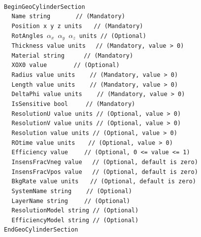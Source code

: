 ~\\
\noindent
{\tt BeginGeoCylinderSection} \\
$~~~~~${\tt Name             string                   $~~~~~~~~~~~~$   // (Mandatory)} \\
$~~~~~${\tt Position         x  y  z units                     $~~~$   // (Mandatory)} \\
$~~~~~${\tt RotAngles        $\alpha_x$  $\alpha_y$  $\alpha_z$ units  // (Optional)}  \\
$~~~~~${\tt Thickness        value  units                       $~~$   // (Mandatory, value > 0)} \\
$~~~~~${\tt Material         string                       $~~~~~~~~$   // (Mandatory)} \\
$~~~~~${\tt XOX0             value                   $~~~~~~~~~~~~~$   // (Optional)}  \\
$~~~~~${\tt Radius           value units                     $~~~~~$   // (Mandatory, value > 0)} \\
$~~~~~${\tt Length           value units                     $~~~~~$   // (Mandatory, value > 0)} \\
$~~~~~${\tt DeltaPhi         value units                     $~~~~~$   // (Mandatory, value > 0)} \\
$~~~~~${\tt IsSensitive      bool                          $~~~~~~~$   // (Mandatory)} \\
$~~~~~${\tt ResolutionU      value units                               // (Optional, value > 0)} \\
$~~~~~${\tt ResolutionV      value units                               // (Optional, value > 0)} \\
$~~~~~${\tt Resolution       value units                               // (Optional, value > 0)} \\
$~~~~~${\tt ROtime           value units                      $~~~~$   // (Optional, value > 0)} \\
$~~~~~${\tt Efficiency       value                          $~~~~~~$   // (Optional, 0 <= value <= 1)} \\
$~~~~~${\tt InsensFracVneg   value                              $~~$   // (Optional, default is zero)} \\
$~~~~~${\tt InsensFracVpos   value                              $~~$   // (Optional, default is zero)} \\
$~~~~~${\tt BkgRate          value units                       $~~~$   // (Optional, default is zero)} \\
$~~~~~${\tt SystemName       string                          $~~~~~$   // (Optional)} \\
$~~~~~${\tt LayerName        string                         $~~~~~~$   // (Optional)} \\
$~~~~~${\tt ResolutionModel  string                                    // (Optional)} \\
$~~~~~${\tt EfficiencyModel  string                                    // (Optional)} \\
{\tt EndGeoCylinderSection}

